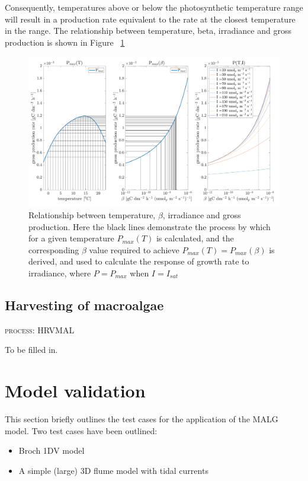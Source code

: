 \documentclass{deltares_manual}
\begin{document}
Consequently, temperatures above or below the photosynthetic temperature range will result in a production rate equivalent to the rate at the closest temperature in the range. The relationship between temperature, beta, irradiance and gross production is shown in Figure ~\ref{fig:lightequations}

\begin{figure}[H]
	\centering
	\includegraphics[width=1\linewidth]{figures/light_equations_crop}
	\caption[]{Relationship between temperature, $\beta$, irradiance and gross production. Here the black lines demonstrate the process by which for a given temperature $P_{max}(T)$ is calculated, and the corresponding $\beta$ value required to achieve $P_{max}(T) = P_{max}(\beta)$ is derived, and used to calculate the response of growth rate to irradiance, where $P = P_{max}$ when $I = I_{sat}$}
	\label{fig:lightequations}
\end{figure}
\pagebreak

\subsection{Harvesting of macroalgae}
\begin{flushright}
	\textsc{process: HRVMAL}
\end{flushright}
To be filled in.
\pagebreak

\section{Model validation}
This section briefly outlines the test cases for the application of the MALG model. Two test cases have been outlined:
\begin{itemize}
	\item Broch 1DV model
	\item A simple (large) 3D flume model with tidal currents
\end{itemize}
\end{document}
